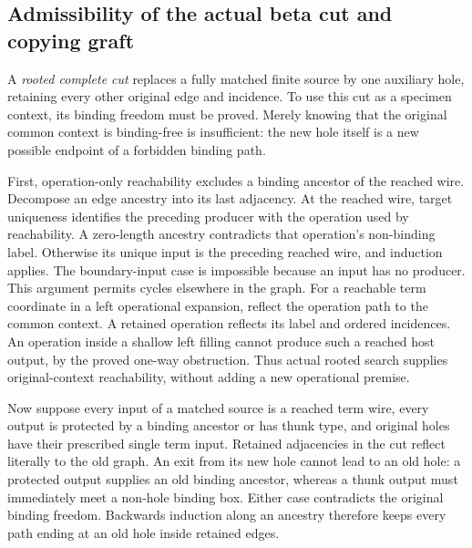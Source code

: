 \subsection{Admissibility of the actual beta cut and copying graft}
A \emph{rooted complete cut} replaces a fully matched finite source by one
auxiliary hole, retaining every other original edge and incidence. To use
this cut as a specimen context, its binding freedom must be proved. Merely
knowing that the original common context is binding-free is insufficient:
the new hole itself is a new possible endpoint of a forbidden binding path.

First, operation-only reachability excludes a binding ancestor of the reached
wire. Decompose an edge ancestry into its last adjacency. At the reached
wire, target uniqueness identifies the preceding producer with the operation
used by reachability. A zero-length ancestry contradicts that operation's
non-binding label. Otherwise its unique input is the preceding reached wire,
and induction applies. The boundary-input case is impossible because an
input has no producer. This argument permits cycles elsewhere in the graph.
For a reachable term coordinate in a left operational expansion, reflect the
operation path to the common context. A retained operation reflects its
label and ordered incidences. An operation inside a shallow left filling
cannot produce such a reached host output, by the proved one-way obstruction.
Thus actual rooted search supplies original-context reachability, without
adding a new operational premise.

Now suppose every input of a matched source is a reached term wire, every
output is protected by a binding ancestor or has thunk type, and original
holes have their prescribed single term input. Retained adjacencies in the
cut reflect literally to the old graph. An exit from its new hole cannot
lead to an old hole: a protected output supplies an old binding ancestor,
whereas a thunk output must immediately meet a non-hole binding box. Either
case contradicts the original binding freedom. Backwards induction along
an ancestry therefore keeps every path ending at an old hole inside retained
edges.

